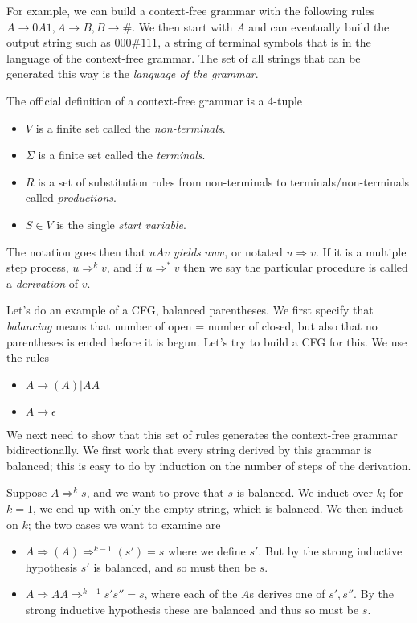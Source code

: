 \documentclass[10pt]{report}
\begin{document}
For example, we can build a context-free grammar with the following rules $A \to 0A1, A \to B, B \to \#$. We then start with $A$ and can eventually build the output string such as $000\#111$, a string of terminal symbols that is in the language of the context-free grammar. The set of all strings that can be generated this way is the \emph{language of the grammar}. 

The official definition of a context-free grammar is a $4$-tuple
\begin{itemize}
    \item $V$ is a finite set called the \emph{non-terminals}.
    \item $\Sigma$ is a finite set called the \emph{terminals}.
    \item $R$ is a set of substitution rules from non-terminals to terminals/non-terminals called \emph{productions}.
    \item $S \in V$ is the single \emph{start variable}.
\end{itemize}

The notation goes then that $uAv$ \emph{yields} $uwv$, or notated $u \Rightarrow v$. If it is a multiple step process, $u \Rightarrow^k v$, and if $u \Rightarrow^* v$ then we say the particular procedure is called a \emph{derivation} of $v$. 

Let's do an example of a CFG, balanced parentheses. We first specify that \emph{balancing} means that number of open = number of closed, but also that no parentheses is ended before it is begun. Let's try to build a CFG for this. We use the rules
\begin{itemize}
    \item $A \to (A)|AA$
    \item $A \to \epsilon$
\end{itemize}

We next need to show that this set of rules generates the context-free grammar bidirectionally. We first work that every string derived by this grammar is balanced; this is easy to do by induction on the number of steps of the derivation. 

Suppose $A \Rightarrow^k s$, and we want to prove that $s$ is balanced. We induct over $k$; for $k=1$, we end up with only the empty string, which is balanced. We then induct on $k$; the two cases we want to examine are
\begin{itemize}
    \item $A \Rightarrow (A) \Rightarrow^{k-1}(s') = s$ where we define $s'$. But by the strong inductive hypothesis $s'$ is balanced, and so must then be $s$.
    \item $A \Rightarrow AA \Rightarrow^{k-1} s's'' = s$, where each of the $A$s derives one of $s', s''$. By the strong inductive hypothesis these are balanced and thus so must be $s$. 
\end{itemize}
\end{document}

